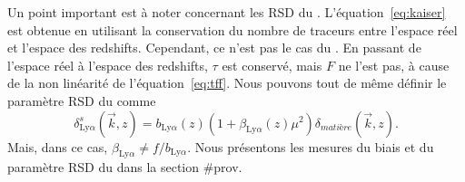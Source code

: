 \documentclass[11pt, twoside, a4paper, openright]{report}
\begin{document}
Un point important est à noter concernant les RSD du \lya{}.
L'équation~\ref{eq:kaiser} est obtenue en utilisant la conservation du nombre de traceurs entre l'espace réel et l'espace des redshifts. Cependant, ce n'est pas le cas du \lya{}.
En passant de l'espace réel à l'espace des redshifts, $\tau$ est conservé, mais $F$ ne l'est pas, à cause de la non linéarité de l'équation~\ref{eq:tff}.
Nous pouvons tout de même définir le paramètre RSD du \lya{} comme
\begin{equation}
  \label{eq:kaiser4}
  \delta_{\mathrm{Ly}\alpha}^{s}(\vec k, z) = b_{\mathrm{Ly}\alpha}(z) (1+ \beta_{\mathrm{Ly}\alpha}(z) \mu^2) \delta_{matière}(\vec k, z)  .
\end{equation}
Mais, dans ce cas, $ \beta_{\mathrm{Ly}\alpha} \neq f / b_{\mathrm{Ly}\alpha}$.
Nous présentons les mesures du biais et du paramètre RSD du \lya{} dans la section \#prov.
\end{document}
